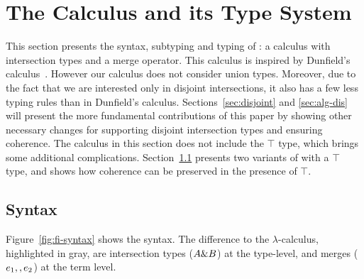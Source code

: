 \section{The \name Calculus and its Type System}
\label{sec:fi}

This section presents the syntax, subtyping and typing of \name: 
a calculus with intersection types and a merge
operator.  This calculus is inspired by Dunfield's
calculus~\cite{dunfield2014elaborating}.  However our calculus does
not consider union types. Moreover, due to the fact that we are
interested only in disjoint intersections, it also has a few less
typing rules than in Dunfield's calculus. Sections~\ref{sec:disjoint}
and \ref{sec:alg-dis} will present the more fundamental contributions
of this paper by showing other necessary changes for supporting
disjoint intersection types and ensuring coherence. The calculus in
this section does not include the $\top$ type, which brings some
additional complications.  Section~\ref{} presents two variants of
\name with a $\top$ type, and shows how coherence can be preserved in
the presence of $\top$.

\subsection{Syntax}

Figure~\ref{fig:fi-syntax} shows the syntax. The difference to the
$\lambda$-calculus, highlighted in gray, are intersection types ($A
\& B$) at
the type-level, and merges ($e_1 ,, e_2$) at the term level.

